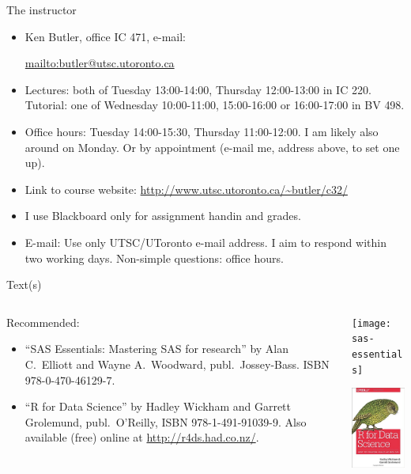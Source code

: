 \documentclass[unknownkeysallowed]{beamer}\usepackage[]{graphicx}\usepackage[]{color}
\begin{document}
\begin{frame}[fragile]{The instructor}

\begin{itemize}
  
\item Ken Butler, office IC 471, e-mail:

    \url{mailto:butler@utsc.utoronto.ca}

\item Lectures: both of Tuesday 13:00-14:00, Thursday 12:00-13:00 in
  IC 220. Tutorial: one of Wednesday 10:00-11:00, 15:00-16:00 or
  16:00-17:00 in BV 498.
\item Office hours: Tuesday 14:00-15:30, Thursday 11:00-12:00. I am
  likely also around on Monday.
  Or by appointment (e-mail me, address above, to set one up).
\item Link to course website: \url{http://www.utsc.utoronto.ca/~butler/c32/}
\item I use Blackboard only for assignment handin and grades.
\item E-mail: Use only UTSC/UToronto e-mail address. I aim
  to respond within two working days. Non-simple questions: office hours.
\end{itemize}

  
\end{frame}

\begin{frame}[fragile]{Text(s)}
  \begin{columns}
    \begin{column}{0.6\textwidth}
Recommended:
  \begin{itemize}
\item ``SAS Essentials: Mastering SAS for research'' by Alan C.\
  Elliott and Wayne A.\ Woodward, publ.\ Jossey-Bass. ISBN 978-0-470-46129-7.
\item ``R for Data Science'' by Hadley Wickham and Garrett Grolemund,
  publ.\ O'Reilly, ISBN 978-1-491-91039-9. Also available (free)
  online at \url{http://r4ds.had.co.nz/}.
\end{itemize}
    \end{column}
    \begin{column}{0.4\textwidth}
      \texttt{[image: sas-essentials]}

      \includegraphics[width=1in]{r4ds}
    \end{column}
  \end{columns}


\end{frame}
\end{document}
